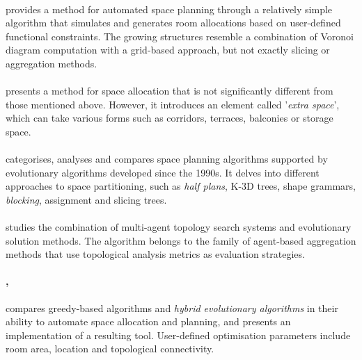 \documentclass[a4paper, 12pt]{report}
\begin{document}
\paragraph{\cite{lopes2010constrained}} provides a method for automated space planning through a relatively simple algorithm that simulates and generates room allocations based on user-defined functional constraints. The growing structures resemble a combination of Voronoi diagram computation with a grid-based approach, but not exactly slicing or aggregation methods.

\paragraph{\cite{shekhawat2014algorithm}} presents a method for space allocation that is not significantly different from those mentioned above. However, it introduces an element called '\textit{extra space}', which can take various forms such as corridors, terraces, balconies or storage space.

\paragraph{\cite{calixto2015literature}} categorises, analyses and compares space planning algorithms supported by evolutionary algorithms developed since the 1990s. It delves into different approaches to space partitioning, such as \textit{half plans}, K-3D trees, shape grammars, \textit{blocking}, assignment and slicing trees.

\paragraph{\cite{guo2017evolutionary}} studies the combination of multi-agent topology search systems and evolutionary solution methods. The algorithm belongs to the family of agent-based aggregation methods that use topological analysis metrics as evaluation strategies.

\paragraph{\cite{nisztuk2019hybrid}, } compares greedy-based algorithms and \textit{hybrid evolutionary algorithms} in their ability to automate space allocation and planning, and presents an implementation of a resulting tool. User-defined optimisation parameters include room area, location and topological connectivity.
\end{document}
